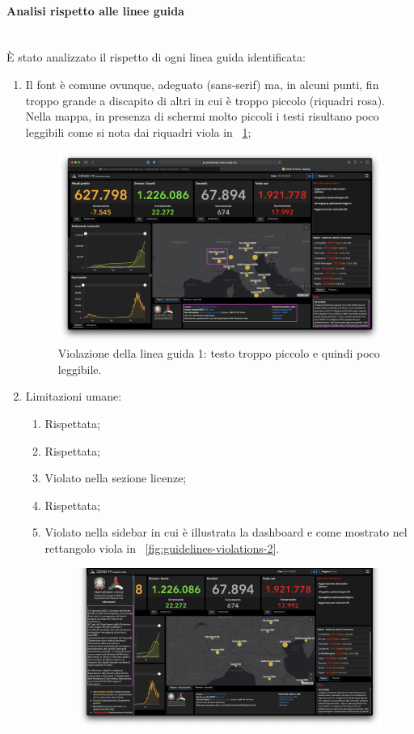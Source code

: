 \paragraph{Analisi rispetto alle linee guida}\mbox{}\\
\`E stato analizzato il rispetto di ogni linea guida identificata:
\begin{enumerate}
    \item Il font è comune ovunque, adeguato (sans-serif) ma, in alcuni punti, fin troppo grande a discapito di altri in cui è troppo piccolo (riquadri rosa). Nella mappa, in presenza di schermi molto piccoli i testi risultano poco leggibili come si nota dai riquadri viola in ~\ref{fig:guidelines-violations-1};
        \begin{figure}[H]
        \centering
        \includegraphics[width=0.5\columnwidth]{../../../assets/images/verifica-risorse-esistenti/guidelines_violations_1.png}
        \caption{Violazione della linea guida 1: testo troppo piccolo e quindi poco leggibile.}
        \label{fig:guidelines-violations-1}
    \end{figure}
    \item Limitazioni umane:
        \begin{enumerate}[label=\alph*.]
                \item Rispettata;
                \item Rispettata;
                \item [\ref{lg:2.c}] Violato nella sezione licenze;
                \item [d.] Rispettata;
                \item [\ref{lg:2.e}] Violato nella sidebar in cui è illustrata la dashboard e come mostrato nel rettangolo viola in ~\ref{fig:guidelines-violations-2}.
                \begin{figure}[H]
                    \centering
                    \includegraphics[width=0.5\columnwidth]{../../../assets/images/verifica-risorse-esistenti/guidelines_violations_2.png}

\end{figure}
\end{enumerate}
\end{enumerate}
